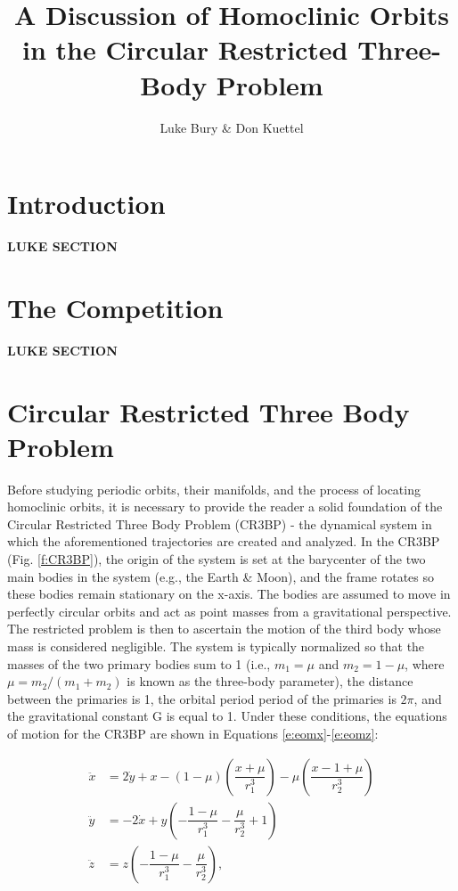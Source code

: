 \documentclass[11pt]{article} %
\title{A Discussion of Homoclinic Orbits in the Circular Restricted Three-Body Problem}
\author{Luke Bury \& Don Kuettel}
\begin{document}
\maketitle
\section{Introduction}
\color{red}\textbf{LUKE SECTION}\color{black}\\

\section{The Competition}
\color{red}\textbf{LUKE SECTION}\color{black}\\


\section{Circular Restricted Three Body Problem}
Before studying periodic orbits, their manifolds, and the process of locating homoclinic orbits, it is necessary to provide the reader a solid foundation of the Circular Restricted Three Body Problem (CR3BP) - the dynamical system in which the aforementioned trajectories are created and analyzed. In the CR3BP (Fig. \ref{f:CR3BP}), the origin of the system is set at the barycenter of the two main bodies in the system (e.g., the Earth \& Moon), and the frame rotates so these bodies remain stationary on the x-axis. The bodies are assumed to move in perfectly circular orbits and act as point masses from a gravitational perspective. The restricted problem is then to ascertain the motion of the third body whose mass is considered negligible. The system is typically normalized so that the masses of the two primary bodies sum to 1 (i.e., $m_1 = \mu$ and $m_2 = 1-\mu$, where $\mu = m_2/(m_1+m_2)$ is known as the three-body parameter), the distance between the primaries is 1, the orbital period period of the primaries is $2\pi$, and the gravitational constant G is equal to 1. Under these conditions, the equations of motion for the CR3BP are shown in Equations \ref{e:eomx}-\ref{e:eomz}:

\begin{align}
	\ddot{x} &= 2\dot{y} + x - (1-\mu)\left(\dfrac{x+\mu}{r_1^3}\right) - \mu\left(\dfrac{x-1+\mu}{r_2^3}\right) \label{e:eomx}\\
	\ddot{y} &= -2\dot{x} + y\left(-\dfrac{1-\mu}{r_1^3} - \dfrac{\mu}{r_2^3} + 1\right) \label{e:eomy}\\
	\ddot{z} &= z\left(-\dfrac{1 - \mu}{r_1^3} - \dfrac{\mu}{r_2^3}\right), \label{e:eomz}
\end{align} 
\end{document}
